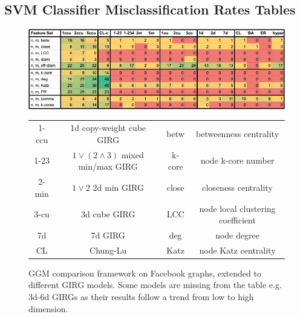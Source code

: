 
\subsection{SVM Classifier Misclassification Rates Tables}

\begin{figure}
    \centering
    \includegraphics[width=\textwidth]{./figures/Blasius_framework_table.png}
    \caption{\cite{blasius2018towards} GGM comparison framework on Facebook graphs, extended to different GIRG models.
    Some models are missing from the table e.g. 3d-6d GIRGs as their results follow a trend from low to high dimension.
    }
    \label{fig:blasius_framework_table}
    \vspace{1em}
    \centering
    \begin{tabular}{|c|c||c|c|}
        \hline
        1-ccu & 1d copy-weight cube GIRG 
        & betw & betweenness centrality
        \\
        1-23 & $1 \lor (2 \land 3)$ mixed min/max GIRG
        & k-core & node k-core number
        \\
        2-min & $1 \lor 2$ 2d min GIRG
        & close & closeness centrality
        \\
        3-cu & 3d cube GIRG
        & LCC & node local clustering coefficient
        \\
        7d & 7d GIRG
        & deg & node degree
        \\
        CL & Chung-Lu
        & Katz & node Katz centrality
        \\

\end{tabular}
\end{figure}
